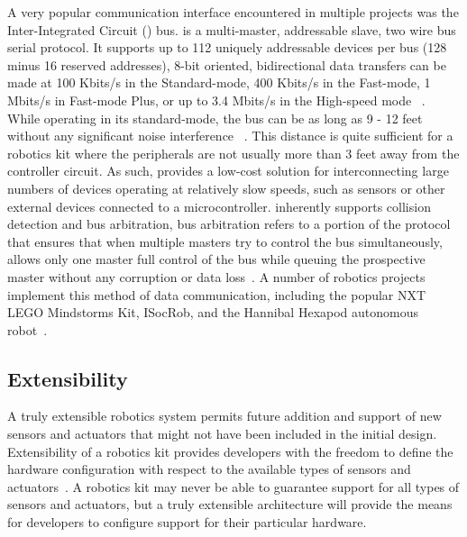 A very popular communication interface encountered in multiple projects was the Inter-Integrated Circuit (\iic) bus. \iic is a multi-master, addressable slave, two wire bus serial protocol. It supports up to 112 uniquely addressable devices per bus (128 minus 16 reserved addresses), 8-bit oriented, bidirectional data transfers can be made at 100 Kbits/s in the Standard-mode, 400 Kbits/s in the Fast-mode, 1 Mbits/s in Fast-mode Plus, or up to 3.4 Mbits/s in the High-speed mode ~\parencite{edubots, i2cfaq}. While operating in its standard-mode, the \iic bus can be as long as 9 - 12 feet without any significant noise interference ~\parencite{hannibal}. This distance is quite sufficient for a robotics kit where the peripherals are not usually more than 3 feet away from the controller circuit. As such, \iic provides a low-cost solution for interconnecting large numbers of devices operating at relatively slow speeds, such as sensors or other external devices connected to a microcontroller. \iic inherently supports collision detection and bus arbitration, bus arbitration refers to a portion of the protocol that ensures that when multiple masters try to control the bus simultaneously, \iic allows only one master full control of the bus while queuing the prospective master without any corruption or data loss~\parencite{nxpi2c}.  A number of robotics projects implement this method of data communication, including the popular NXT LEGO Mindstorms Kit, ISocRob, and the Hannibal Hexapod autonomous robot~\parencite{hannibal, Ventura}.




\subsection{Extensibility} %
\label{sub:extensibility}
A truly extensible robotics system permits future addition and support of new sensors and actuators that might not have been included in the initial design. Extensibility of a robotics kit provides developers with the freedom to define the hardware configuration with respect to the available types of sensors and actuators~\parencite{rdk}. A robotics kit may never be able to guarantee support for all types of sensors and actuators, but a truly extensible architecture will provide the means for developers to configure support for their particular hardware. 

